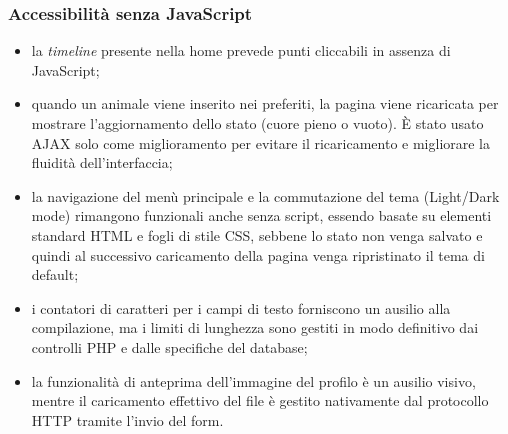 \subsubsection{Accessibilità senza JavaScript}
\label{sec:javascript_accessibilita}
\begin{itemize} 
    \item la \textit{timeline} presente nella home prevede punti cliccabili in assenza di JavaScript; 
    \item quando un animale viene inserito nei preferiti, la pagina viene ricaricata per mostrare l'aggiornamento dello stato (cuore pieno o vuoto). È stato usato AJAX solo come miglioramento per evitare il ricaricamento e migliorare la fluidità dell'interfaccia; 
    \item la navigazione del menù principale e la commutazione del tema (Light/Dark mode) rimangono funzionali anche senza script, essendo basate su elementi standard HTML e fogli di stile CSS, sebbene lo stato non venga salvato e quindi al successivo caricamento della pagina venga ripristinato il tema di default;
    \item i contatori di caratteri per i campi di testo forniscono un ausilio alla compilazione, ma i limiti di lunghezza sono gestiti in modo definitivo dai controlli PHP e dalle specifiche del database;
    \item la funzionalità di anteprima dell'immagine del profilo è un ausilio visivo, mentre il caricamento effettivo del file è gestito nativamente dal protocollo HTTP tramite l'invio del form.
\end{itemize}